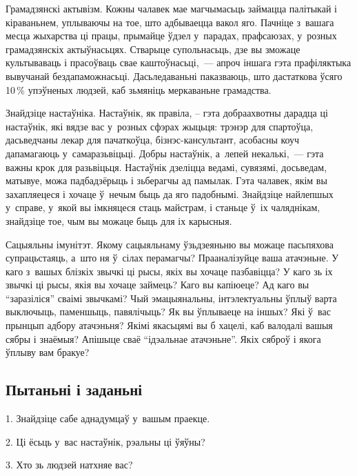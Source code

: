 Грамадзянскі актывізм. Кожны чалавек мае магчымасьць займацца палітыкай і кіраваньнем, уплываючы на тое, што адбываецца вакол яго. Пачніце з~вашага месца жыхарства ці працы, прымайце ўдзел у~парадах, прафсаюзах, у~розных грамадзянскіх актыўнасьцях. Стварыце супольнасьць, дзе вы зможаце культываваць і прасоўваць свае каштоўнасьці,~--- апроч іншага гэта прафіляктыка вывучанай бездапаможнасьці. Дасьледаваньні паказваюць, што дастаткова ўсяго 10\,\% упэўненых людзей, каб зьмяніць меркаваньне грамадства.

Знайдзіце настаўніка. Настаўнік, як правіла, -- гэта добраахвотны дарадца ці настаўнік, які вядзе вас у~розных сфэрах жыцьця: трэнэр для спартоўца, дасьведчаны лекар для пачаткоўца, бізнэс-кансультант, асобасны коуч дапамагаюць у~самаразьвіцьці. Добры настаўнік, а~лепей некалькі,~--- гэта важны крок для разьвіцьця. Настаўнік дзеліцца ведамі, сувязямі, досьведам, матывуе, можа падбадзёрыць і зьберагчы ад памылак. Гэта чалавек, якім вы захапляецеся і хочаце ў~нечым быць да яго падобнымі. Знайдзіце найлепшых у~справе, у~якой вы імкняцеся стаць майстрам, і станьце ў~іх чаляднікам, знайдзіце тое, чым вы можаце быць для іх карысныя.

Сацыяльны імунітэт. Якому сацыяльнаму ўзьдзеяньню вы можаце пасьпяхова супрацьстаяць, а~што ня ў~сілах перамагчы? Прааналізуйце ваша атачэньне. У каго з~вашых блізкіх звычкі ці рысы, якіх вы хочаце пазбавіцца? У каго зь іх звычкі ці рысы, якія вы хочаце займець? Каго вы капіюеце? Ад каго вы ``заразіліся'' сваімі звычкамі? Чый эмацыянальны, інтэлектуальны ўплыў варта выключыць, паменшыць, павялічыць? Як вы ўплываеце на іншых? Які ў~вас прынцып адбору атачэньня? Якімі якасьцямі вы б хацелі, каб валодалі вашыя сябры і знаёмыя? Апішыце сваё ``ідэальнае атачэньне''. Якіх сяброў і якога ўплыву вам бракуе?

\subsection*{Пытаньні і заданьні}

1. Знайдзіце сабе аднадумцаў у~вашым праекце.

2. Ці ёсьць у~вас настаўнік, рэальны ці ўяўны?

3. Хто зь людзей натхняе вас?
